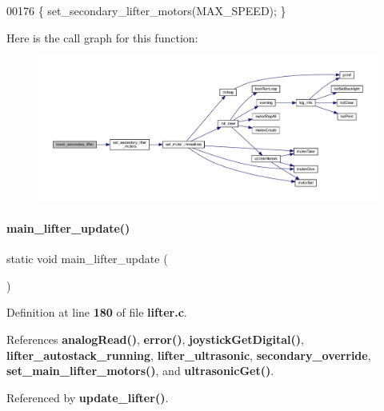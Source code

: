 \begin{DoxyCode}
00176 \{ set_secondary_lifter_motors(MAX\_SPEED); \}
\end{DoxyCode}
Here is the call graph for this function\+:
\nopagebreak
\begin{figure}[H]
\begin{center}
\leavevmode
\includegraphics[width=350pt]{lifter_8c_af76abbd394bf206ab56fa237d776f2b3_cgraph}
\end{center}
\end{figure}
\mbox{\label{lifter_8c_adfb6207ee1f20953058c8de81ec3386a}} 
\paragraph{main\+\_\+lifter\+\_\+update()}
{\footnotesize\ttfamily static void main\+\_\+lifter\+\_\+update (\begin{DoxyParamCaption}{ }\end{DoxyParamCaption})\hspace{0.3cm}{\ttfamily [static]}}



Definition at line \textbf{ 180} of file \textbf{ lifter.\+c}.



References \textbf{ analog\+Read()}, \textbf{ error()}, \textbf{ joystick\+Get\+Digital()}, \textbf{ lifter\+\_\+autostack\+\_\+running}, \textbf{ lifter\+\_\+ultrasonic}, \textbf{ secondary\+\_\+override}, \textbf{ set\+\_\+main\+\_\+lifter\+\_\+motors()}, and \textbf{ ultrasonic\+Get()}.



Referenced by \textbf{ update\+\_\+lifter()}.


